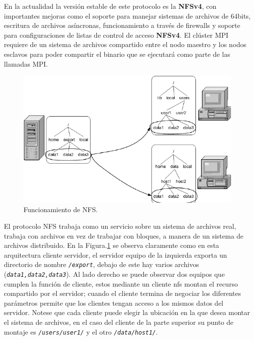\documentclass[letterpaper, 12pt, oneside]{article}
\begin{document}
    En la actualidad la versión estable de este protocolo es la \textbf{NFSv4},  con importantes mejoras como el soporte para manejar sistemas de archivos de 64bits, escritura de archivos asíncronas, funcionamiento a través de firewalls y soporte  para configuraciones de listas de control de acceso \textbf{NFSv4}. El clúster MPI requiere de un sistema de archivos compartido entre el nodo maestro y los nodos esclavos para poder compartir el binario que se ejecutará como parte de las llamadas MPI. 
    
    \begin{figure}[H]
    \includegraphics[scale=0.7]{img/nfs/nfs.png}
    \caption{Funcionamiento de NFS.}
        \label{fig:nfs1}
    \end{figure}
    El protocolo NFS trabaja como un servicio sobre un sistema de archivos real, trabaja con archivos en vez de trabajar con bloques, a manera de un sistema de archivos distribuido. En la Figura.\ref{fig:nfs1} se observa claramente como en esta arquitectura cliente servidor, el servidor equipo de la izquierda exporta un directorio de nombre \texttt{\textit{\//export}}, debajo de este hay varios archivos (\texttt{\textit{data1,data2,data3}}). Al lado derecho se puede observar dos equipos que cumplen la función de cliente, estos mediante un cliente nfs montan el recurso compartido por el servidor; cuando el cliente termina de negociar los diferentes parámetros permite que los clientes tengan acceso a los mismos datos del servidor. Notese que cada cliente puede elegir la ubicación en la que desea montar el sistema de archivos, en el caso del cliente de la parte superior su punto de montaje es  \texttt{\textit{\//users/user1/}} y el otro \texttt{\textit{\//data/host1/}}.
    
\end{document}
